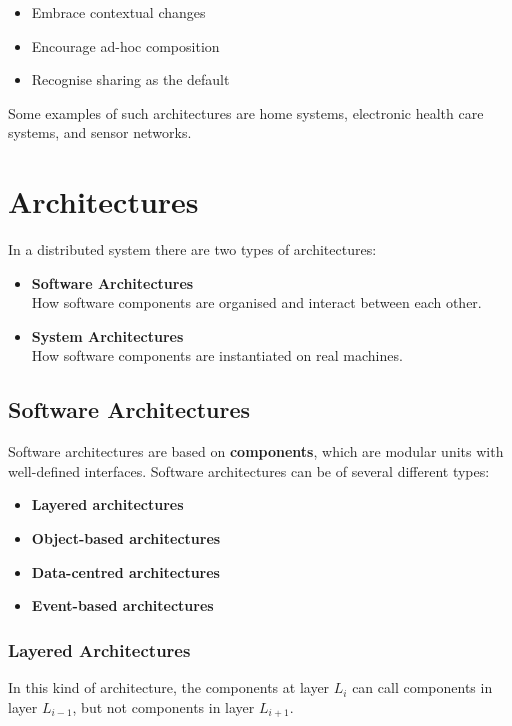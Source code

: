 \documentclass{article}
\begin{document}
\begin{itemize}
	\item Embrace contextual changes
	\item Encourage ad-hoc composition
	\item Recognise sharing as the default
\end{itemize}

\noindent Some examples of such architectures are home systems, electronic health care systems, and sensor networks.

\section{Architectures}
In a distributed system there are two types of architectures:

\begin{itemize}
	\item \textbf{Software Architectures} \\
	How software components are organised and interact between each other.
	
	\item \textbf{System Architectures} \\
	How software components are instantiated on real machines.
\end{itemize}

\subsection{Software Architectures}
Software architectures are based on \textbf{components}, which are modular units with well-defined interfaces. Software architectures can be of several different types:

\begin{itemize}
	\item \textbf{Layered architectures}
	\item \textbf{Object-based architectures}
	\item \textbf{Data-centred architectures}
	\item \textbf{Event-based architectures}
\end{itemize}

\subsubsection{Layered Architectures}
In this kind of architecture, the components at layer $L_i$ can call components in layer $L_{i-1}$, but not components in layer $L_{i+1}$.
\end{document}
